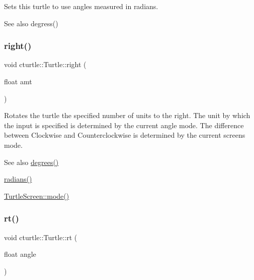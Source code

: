 Sets this turtle to use angles measured in radians. \begin{DoxySeeAlso}{See also}
degress() 
\end{DoxySeeAlso}
\mbox{\label{classcturtle_1_1Turtle_a3586f116fccc417ffa74c115ec3eef54}} 
\subsubsection{\texorpdfstring{right()}{right()}}
{\footnotesize\ttfamily void cturtle\+::\+Turtle\+::right (\begin{DoxyParamCaption}\item[{float}]{amt }\end{DoxyParamCaption})}



Rotates the turtle the specified number of units to the right. The unit by which the input is specified is determined by the current angle mode. The difference between Clockwise and Counterclockwise is determined by the current screen\textquotesingle{}s mode. 

\begin{DoxySeeAlso}{See also}
\hyperlink{classcturtle_1_1Turtle_aa68704b24017c6a8cda41ff292ecafde}{degrees()} 

\hyperlink{classcturtle_1_1Turtle_a9c266e318f05dc5d45ddbeb830a373fa}{radians()} 

\hyperlink{classcturtle_1_1InteractiveTurtleScreen_a1c666afe65211cf9eedaffa17206a697}{Turtle\+Screen\+::mode()} 
\end{DoxySeeAlso}
\mbox{\label{classcturtle_1_1Turtle_a5416304d65c9bbebe0fabd9914123a79}} 
\subsubsection{\texorpdfstring{rt()}{rt()}}
{\footnotesize\ttfamily void cturtle\+::\+Turtle\+::rt (\begin{DoxyParamCaption}\item[{float}]{angle }\end{DoxyParamCaption})\hspace{0.3cm}{\ttfamily [inline]}}



